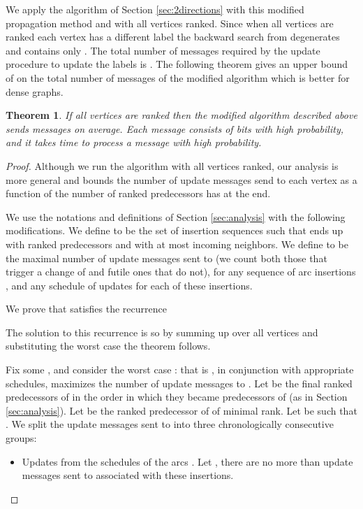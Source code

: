 \documentclass[11pt]{article}
\theoremstyle{plain}
\newtheorem{thm}{Theorem}[section]
\theoremstyle{definition}
\theoremstyle{remark}
\numberwithin{equation}{section}
\begin{document}
We apply the algorithm of Section \ref{sec:2directions} with this
modified propagation method and with all vertices ranked. Since when
all vertices are ranked each vertex has a different label the
backward search from  degenerates and contains only . The
total number of messages required by the update procedure to update
the labels is . The following theorem gives an
 upper bound of  on the total number of messages of
 the modified algorithm which is better for dense graphs.

\begin{thm}
If all vertices are ranked then the modified algorithm described
above sends  messages on average. Each message
consists
 of  bits with high probability, and it takes  time to process a message with high probability.
\end{thm}
\begin{proof}
Although we run the algorithm with all vertices ranked, our analysis
is more general and bounds the number of update messages send to
each vertex  as a function of the number of ranked predecessors
 has at the end.

We use the notations and definitions of Section \ref{sec:analysis}
with the following modifications. We define  to be the
set of insertion sequences such that  ends up with  ranked
predecessors and with at most  incoming neighbors. We define
  to be
the maximal number of update messages sent  to  (we count both
those that trigger a change of  and futile ones that do
not), for any sequence of arc insertions ,
and any schedule of updates for each of these insertions.

We prove that   satisfies the recurrence

The solution to this recurrence is  so by summing up
over all vertices and substituting the worst case  the theorem
follows.

Fix some , and consider the worst case :
that is , in conjunction with appropriate schedules,
maximizes the number of update messages to . Let
  be the final ranked predecessors of  in the order
 in which they became predecessors of  (as in Section \ref{sec:analysis}).
  Let  be the ranked predecessor of  of minimal rank.
Let  be such that .
  We split the update messages sent to  into three chronologically consecutive groups:
  \begin{itemize}
    \item Updates from the schedules of the arcs . Let , there are no more than 
    update messages sent to  associated with these insertions.


\end{itemize}
\end{proof}
\end{document}
